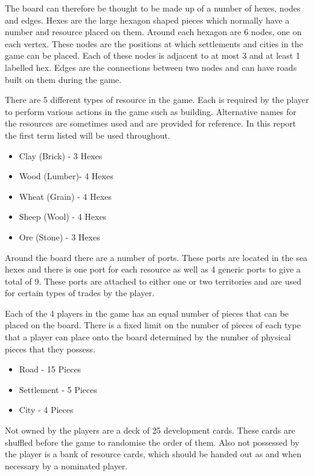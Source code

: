 \documentclass[]{article}
\begin{document}
\par The board can therefore be thought to be made up of a number of hexes, nodes and edges. Hexes are the large hexagon shaped pieces which normally have a number and resource placed on them. Around each hexagon are 6 nodes, one on each vertex. These nodes are the positions at which settlements and cities in the game can be placed. Each of these nodes is adjacent to at most 3 and at least 1 labelled hex. Edges are the connections between two nodes and can have roads built on them during the game.

\par There are 5 different types of resource in the game. Each is required by the player to perform various actions in the game such as building. Alternative names for the resources are sometimes used and are provided for reference. In this report the first term listed will be used throughout.
\begin{itemize}
  \item Clay (Brick) - 3 Hexes
  \item Wood (Lumber)- 4 Hexes
  \item Wheat (Grain) - 4 Hexes
  \item Sheep (Wool) - 4 Hexes 
  \item Ore (Stone) - 3 Hexes
\end{itemize}

\par Around the board there are a number of ports. These ports are located in the sea hexes and there is one port for each resource as well as 4 generic ports to give a total of 9. These ports are attached to either one or two territories and are used for certain types of trades by the player.

\par Each of the 4 players in the game has an equal number of pieces that can be placed on the board. There is a fixed limit on the number of pieces of each type that a player can place onto the board determined by the number of physical pieces that they possess. 

\begin{itemize}
  \item Road - 15 Pieces
  \item Settlement - 5 Pieces
  \item City - 4 Pieces
\end{itemize}


\par Not owned by the players are a deck of 25 development cards. These cards are shuffled before the game to randomise the order of them. Also not possessed by the player is a bank of resource cards, which should be handed out as and when necessary by a nominated player.
\end{document}
